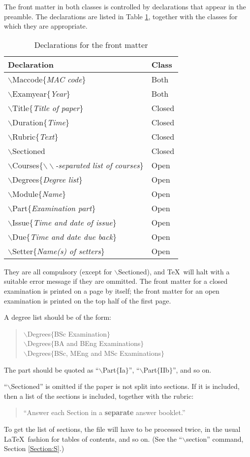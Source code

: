 \documentclass[12pt,twoside]{article}
\newcommand{\kwd}[1]{\textsf{#1}}
\newcommand{\cmd}[1]{$\backslash$\textsf{#1}}
\newcommand{\tcmd}[3]{\cmd{#1}$\{$#3{#2}$\}$}
\newcommand{\dcmd}[2]{\tcmd{#1}{#2}{\emph}}
\newcommand{\pcmd}[2]{\tcmd{#1}{#2}{\kwd}}
\begin{document}
The front matter in both classes is controlled by declarations that
appear in the preamble.  The declarations are listed in Table
\ref{Declarations:T}, together with the classes for which they are
appropriate.
\begin{table}
\begin{center}
\begin{tabular}[t]{l|l}
Declaration&Class\\\hline
\dcmd{Maccode}{MAC code}&Both\\
\dcmd{Examyear}{Year}&Both\\\hline
\dcmd{Title}{Title of paper}&Closed\\
\dcmd{Duration}{Time}&Closed\\
\dcmd{Rubric}{Text}&Closed\\
\cmd{Sectioned}&Closed\\\hline
\dcmd{Courses}{$\backslash\backslash$-separated list of courses}&Open\\
\dcmd{Degrees}{Degree list}&Open\\
\dcmd{Module}{Name}&Open\\
\dcmd{Part}{Examination part}&Open\\
\dcmd{Issue}{Time and date of issue}&Open\\
\dcmd{Due}{Time and date due back}&Open\\
\dcmd{Setter}{Name(s) of setters}&Open
\end{tabular}
\end{center}
\caption{Declarations for the front matter}\label{Declarations:T}
\end{table}
They are all compulsory (except for \cmd{Sectioned}), and \TeX\ will
halt with a suitable error message if they are ommitted.  The front
matter for a closed examination is printed on a page by itself; the
front matter for an open examination is printed on the top half of the
first page.

A degree list should be of the form:
\begin{verse}
        \pcmd{Degrees}{BSc Examination}\\
        \pcmd{Degrees}{BA and BEng Examinations}\\
        \pcmd{Degrees}{BSc, MEng and MSc Examinations}
\end{verse}

The part should be quoted as ``\pcmd{Part}{Ia}'', ``\pcmd{Part}{IIb}'',
and so on. 

``\cmd{Sectioned}'' is omitted if the paper is not split into
sections.  If it is included, then a list of the sections is included,
together with the rubric:
\begin{quote}
``Answer each Section in a \textbf{separate} answer booklet.''
\end{quote}
To get the list of sections, the file will have to be processed twice,
in the usual \LaTeX\ fashion for tables of contents, and so on.  (See
the ``\cmd{section}'' command, Section \ref{Section:S}.)
\end{document}
